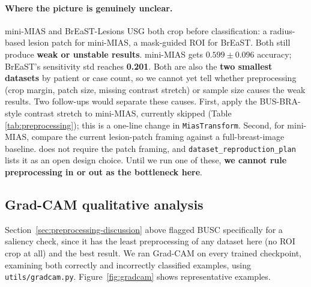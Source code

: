 \documentclass[11pt]{article}
\begin{document}
\paragraph{Where the picture is genuinely unclear.} mini-MIAS and
BrEaST-Lesions USG both crop before classification: a radius-based lesion
patch for mini-MIAS, a mask-guided ROI for BrEaST. Both still produce
\textbf{weak or unstable results}. mini-MIAS gets \textbf{$0.599 \pm 0.096$}
accuracy; BrEaST's sensitivity std reaches \textbf{0.201}. Both are also
the \textbf{two smallest datasets} by patient or case count, so we cannot
yet tell whether preprocessing (crop margin, patch size, missing contrast
stretch) or sample size causes the weak results. Two follow-ups would
separate these causes. First, apply the BUS-BRA-style contrast stretch to
mini-MIAS, currently skipped (Table \ref{tab:preprocessing}); this is a
one-line change in \texttt{MiasTransform}. Second, for mini-MIAS, compare
the current lesion-patch framing against a full-breast-image baseline.
\citet{suckling1994mias} does not require the patch framing, and
\texttt{dataset\_reproduction\_plan} lists it as an open design choice.
Until we run one of these, \textbf{we cannot rule preprocessing in or out
as the bottleneck here}.

\subsection{Grad-CAM qualitative analysis}
\label{sec:gradcam}

Section~\ref{sec:preprocessing-discussion} above flagged BUSC specifically
for a saliency check, since it has the least preprocessing of any dataset
here (no ROI crop at all) and the best result. We ran Grad-CAM
\citep{selvaraju2017gradcam} on every trained checkpoint, examining both
correctly and incorrectly classified examples, using
\texttt{utils/gradcam.py}. Figure~\ref{fig:gradcam} shows representative
examples.
\end{document}
